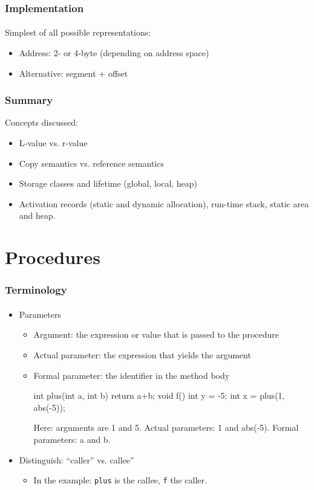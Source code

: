 \documentclass{beamer}
\begin{document}
{\begin{frame}[fragile]
\end{frame}



\begin{frame}[fragile]
\frametitle{Implementation}
\framesubtitle{}
Simplest of all possible representations:
\begin{itemize}
\item Address: 2- or 4-byte (depending on address space)
\item Alternative: segment + offset
\end{itemize}
\end{frame}


} %

\begin{frame}[fragile]
\frametitle{Summary}
Concepts discussed:
\bigskip

\begin{itemize}
\item L-value vs. r-value
\item Copy semantics vs. reference semantics
\item Storage classes and lifetime (global, local, heap)
\item Activation records (static and dynamic allocation), run-time stack,
static area and heap. 
\end{itemize}
\end{frame}


\section{Procedures}
\begin{frame}[fragile]
\frametitle{Terminology}
\framesubtitle{}

\begin{itemize}

\item Parameters
\begin{itemize}
\item Argument: the expression or value that is passed to the procedure
\item Actual parameter: the expression that yields the argument 
\item Formal parameter: the identifier in the method body 
\begin{cplus3}
int plus(int a, int b) {
   return a+b;
}
void f()  {
   int y = -5;
   int x = plus(1, abs(-5));
}
\end{cplus3}
Here: arguments are 1 and 5. Actual parameters: 1 and abs(-5). Formal
parameters: a and b. 
\end{itemize}
\item Distinguish: ``caller'' vs. callee''
\begin{itemize}
\item  In the example: \texttt{plus} is the callee, 
\texttt{f} the caller.
\end{itemize}
\end{itemize}


\end{frame}
\end{document}
